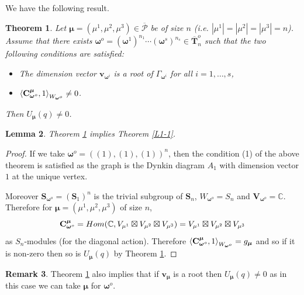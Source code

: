 \documentclass[11pt]{article}
\newtheorem{theo}{Theorem}[section]
\newtheorem{lemm}[theo]{Lemma}
\theoremstyle{definition}
\newtheorem{rema}[theo]{Remark}
\numberwithin{equation}{section}
\newcommand{\calP}{\mathcal{P}}
\newcommand{\bv}{{\mathbf{v}}}
\newcommand{\C}{{\bf C}}
\newcommand{\muhat}{{\boldsymbol \mu}}
\newcommand{\omegahat}{{\boldsymbol \omega}}
\begin{document}
We have the following result.

\begin{theo} \cite[Corollary 5]{L1} Let $\muhat=(\mu^1,\mu^2,\mu^3)\in\overline{\calP}$ be of size $n$ (i.e. $|\mu^1|=|\mu^2|=|\mu^3|=n$). Assume that there exists $\omegahat^o=(\omegahat^1)^{n_1}\cdots(\omegahat^s)^{n_s}\in\overline{\mathbf{T}}_n^o$ such that the two following conditions are satisfied:
\begin{itemize}
\item[(1)]The dimension vector $\bv_{\omegahat^i}$ is a root of $\Gamma_{\omegahat^i}$ for all $i=1,\dots,s$, 
\item[(2)] $\left\langle \C^\muhat_{\omegahat^o},1\right\rangle_{W_{\omegahat^o}}\neq 0$.
\end{itemize}
Then $U_\muhat(q)\neq 0$.
	\label{L1-3}\end{theo}

\begin{lemm}Theorem \ref{L1-3} implies Theorem \ref{L1-1}.
\end{lemm}

\begin{proof} If we take $\omegahat^o=((1),(1),(1))^n$, then the condition (1) of the above theorem  is satisfied as the graph is the Dynkin diagram $A_1$ with dimension vector $1$ at the unique vertex. 
	
	Moreover ${\mathbf{S}}_{\omegahat^o}=({\mathbf{S}}_1)^n$ is the trivial subgroup of ${\mathbf{S}}_n$, $W_{\omegahat^o}=S_n$ and ${\mathbf{V}}_{\omegahat^o}=\mathbb{C}$. Therefore for $\muhat=(\mu^1,\mu^2,\mu^3)$ of size $n$,
	$$
	\C^\muhat_{\omegahat^o}={\rm Hom}(\mathbb{C},V_{\mu^1}\boxtimes V_{\mu^2}\boxtimes V_{\mu^3})=V_{\mu^1}\boxtimes V_{\mu^2}\boxtimes V_{\mu^3}
	$$
	as $S_n$-modules (for the diagonal action). Therefore $\left\langle \C^\muhat_{\omegahat^o},1\right\rangle_{W_{\omegahat^o}}=g_\muhat$ and so if it is non-zero then so is $U_\muhat(q)$ by Theorem \ref{L1-3}.  
\end{proof}




\begin{rema}Theorem \ref{L1-3} also implies that if $\bv_\muhat$ is a root then $U_\muhat(q)\neq 0$ as in this case we can take $\muhat$ for $\omegahat^o$.
	\label{L1-2}\end{rema}
\end{document}
